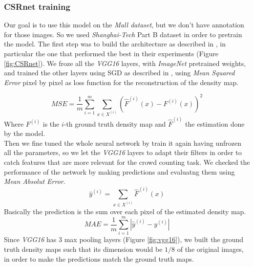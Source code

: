 \documentclass[10pt,twocolumn,letterpaper]{article}
\begin{document}
\subsubsection{CSRnet training}
Our goal is to use this model on the \textit{Mall dataset}, but we don't have annotation for those images. So we used \textit{Shanghai-Tech} Part B dataset in order to pretrain the model. The first step was to build the architecture as described in \cite{li2018csrnet}, in particular the one that performed the best in their experiments (Figure \ref{fig:CSRnet}). We froze all the \textit{VGG16} layers, with \textit{ImageNet} pretrained weights, and trained the other layers using SGD as described in \cite{li2018csrnet}, using \textit{Mean Squared Error} pixel by pixel as loss function for the reconstruction of the density map.

\begin{equation}
	MSE = \frac{1}{m}  \sum_{i = 1}^{m} \sum_{x \in X^{(i)}} (\hat{F}^{(i)}(x) - F^{(i)}(x))^2 \label{eq:MAE}
\end{equation}
Where $F^{(i)}$ is the $i$-th ground truth density map and $\hat{F}^{(i)}$ the estimation done by the model.\\
 Then we fine tuned the whole neural network by train it again having unfrozen all the parameters, so we let the \textit{VGG16} layers to adapt their filters in order to catch features that are more relevant for the crowd counting task. We checked the performance of the network by making predictions and evaluatng them using \textit{Mean Absolut Error}.
\begin{equation}
	\hat{y}^{(i)} = \sum_{x \in X^{(i)}}\hat{F}^{(i)}(x)
\end{equation}
Basically the prediction is the sum over each pixel of the estimated density map.
\begin{equation}
	MAE = \frac{1}{m}  \sum_{i = 1}^{m} |\hat{y}^{(i)} - y^{(i)}|\label{eq:MAE}
\end{equation}
Since \textit{VGG16} has 3 max pooling layers (Figure \ref{fig:vgg16}), we built the ground truth density maps such that its dimension would be $1/8$ of the original images, in order to make the predictions match the ground truth maps.
\end{document}
